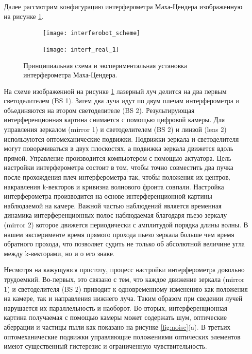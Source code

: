 Далее рассмотрим конфигурацию интерферометра Маха-Цендера изображенную на рисунке \ref{fig:interf_scheme_1}. 

\begin{figure}[ht]
    \centering
     \begin{subfigure}[b]{0.45\linewidth}
         \centering
         \texttt{[image: interferobot\_scheme]}
     \end{subfigure}
     \centering
     \begin{subfigure}[b]{0.45\linewidth}
         \centering
         \texttt{[image: interf\_real\_1]}
     \end{subfigure}
    \caption{
     Принципиальная схема и экспериментальная установка интерферометра Маха-Цендера. }
\label{fig:interf_scheme_1}
\end{figure}

На схеме изображенной на рисунке \ref{fig:interf_scheme_1} лазерный луч делится на два первым светоделителем (BS 1). Затем два луча идут по двум плечам интерферометра и объединяются на втором светоделителе (BS 2). Результирующая интерференционная картина снимается с помощью цифровой камеры. Для управления зеркалом (mirror 1) и светоделителем (BS 2) и линзой (lens 2) используются оптомеханические подвижки. Подвижки зеркала и светоделителя могут поворачиваться в двух плоскостях, а подвижка зеркала движется вдоль прямой. Управление производится компьютером с помощью актуатора. Цель настройки интерферометра состоит в том, чтобы точно совместить два пучка после прохождения плеч интерферометра так, чтобы положения их центров, накравления k-векторов и кривизна волнового фронта совпали. Настройка интерферометра производится на основе интерференционной картины наблюдаемой на камере. Важной частью наблюдений является временная динамика интерференционных полос наблюдаемая благодаря пьезо зеркалу (mirror 2) которое движется периодически с амплитудой порядка длины волны. В нашем эксперименте время прямого прохода пьезо зеркала больше чем время обратного прохода, что позволяет судить не только об абсолютной величине угла между k-векторами, но и о его знаке. 

Несмотря на кажущуюся простоту, процесс настройки интерферометра довольно трудоемкий. Во-первых, это связано с тем, что каждое движение зеркала  (mirror 1) и светоделителя (BS 2) приводит к одновременному изменению как положения на камере, так и направления нижнего луча. Таким образом при сведении лучей нарушается их параллельность и наоборот. Во-вторых, интерференционная картина получаемая с помощью камеры может содержать шум, оптические аберрации и частицы пыли как показано на рисунке \ref{fig:noise}(a). В третьих оптомеханические подвижки управляющие положениями оптических элементов имеют существенный гистерезис и ограниченную чувствительность.

